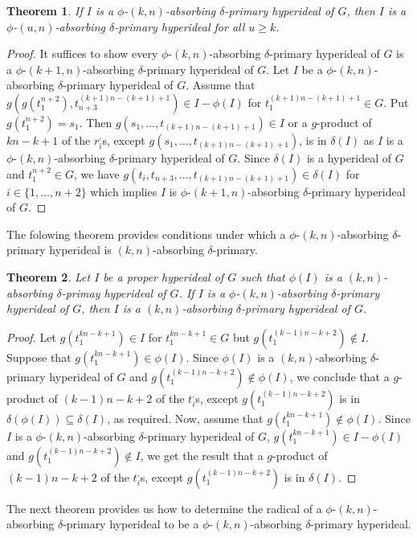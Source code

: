 \documentclass[preprint,review,10pt]{amsart}
\newtheorem{theorem}{Theorem}[section]
\theoremstyle{definition}
\theoremstyle{remark}
\numberwithin{equation}{section}
\begin{document}
\begin{theorem}
If $I$ is a $\phi$-$(k,n)$-absorbing $\delta$-primary hyperideal of $G$, then $I$ is a $\phi$-$(u,n)$-absorbing $\delta$-primary hyperideal for all $u \geq k$.
\end{theorem}
\begin{proof}
It suffices to show  every $\phi$-$(k,n)$-absorbing $\delta$-primary hyperideal of $G$ is a $\phi$-$(k+1,n)$-absorbing $\delta$-primary hyperideal of $G$. Let $I$ be a $\phi$-$(k,n)$-absorbing $\delta$-primary hyperideal of $G$. Assume that $g(g(t_1^{n+2}),t_{n+3}^{(k+1)n-(k+1)+1}) \in I-\phi(I)$ for $t_1^{(k+1)n-(k+1)+1} \in G$. Put $g(t_1^{n+2})=s_1$. Then  $g(s_1,\ldots,t_{(k+1)n-(k+1)+1}) \in I$ or a $g$-product of $kn-k+1$ of the $r_i^,$s, except $g(s_1,\ldots, t_{(k+1)n-(k+1)+1})$, is in $\delta(I)$ as $I$ is a $\phi$-$(k,n)$-absorbing $\delta$-primary hyperideal of $G$. Since $\delta(I)$ is a hyperideal of $G$ and $t_1^{n+2} \in G$, we have $g(t_i,t_{n+3},\ldots,t_{(k+1)n-(k+1)+1}) \in \delta(I)$ for $i \in \{1,\ldots,n+2\}$
which implies  $I$ is $\phi$-$(k+1,n)$-absorbing $\delta$-primary hyperideal of $G$.
\end{proof}
The folowing  theorem provides conditions under which a $\phi$-$(k,n)$-absorbing $\delta$-primary hyperideal is $(k,n)$-absorbing $\delta$-primary.
\begin{theorem}
Let  $I$ be a proper hyperideal of $G$  such that $\phi(I)$ is a $(k,n)$-absorbing $\delta$-primay hyperideal of $G$. If $I$ is a $\phi$-$(k,n)$-absorbing $\delta$-primary hyperideal of $G$, then $I$ is a $(k,n)$-absorbing $\delta$-primary hyperideal of $G$.
\end{theorem}
\begin{proof}
Let  $g(t_1^{kn-k+1}) \in I$ for $t_1^{kn-k+1} \in G$ but $g(t_1^{(k-1)n-k+2}) \notin I$. Suppose that $g(t_1^{kn-k+1}) \in \phi(I)$. Since $\phi(I)$ is a $(k,n)$-absorbing $\delta$-primary hyperideal of $G$ and $g(t_1^{(k-1)n-k+2}) \notin \phi(I)$, we conclude that a $g$-product of $(k-1)n-k+2$ of the $t_i^,$s, except $g(t_1^{(k-1)n-k+2})$ is in $\delta(\phi(I))\subseteq \delta(I)$, as required. Now, assume that $g(t_1^{kn-k+1}) \notin \phi(I)$. Since $I$ is a $\phi$-$(k,n)$-absorbing $\delta$-primary hyperideal of $G$,  $g(t_1^{kn-k+1}) \in I - \phi(I)$ and $g(t_1^{(k-1)n-k+2}) \notin I$, we get the result that a $g$-product of $(k-1)n-k+2$ of the $t_i^,$s, except $g(t_1^{(k-1)n-k+2})$ is in $\delta(I)$.
\end{proof}
The next theorem provides us how to determine the radical of a $\phi$-$(k,n)$-absorbing $\delta$-primary hyperideal to be a $\phi$-$(k,n)$-absorbing $\delta$-primary hyperideal.
\end{document}
